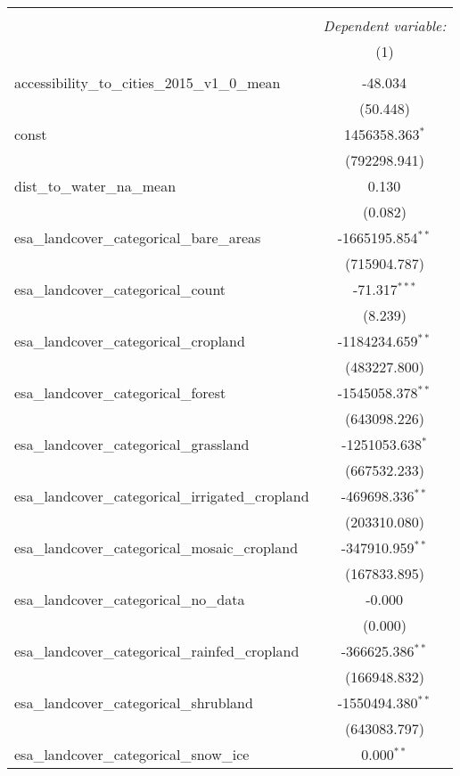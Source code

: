 \begin{table}[!htbp] \centering
\begin{tabular}{@{\extracolsep{5pt}}lc}
\\[-1.8ex]\hline
\hline \\[-1.8ex]
& \multicolumn{1}{c}{\textit{Dependent variable:}} \
\cr \cline{1-2}
\\[-1.8ex] & (1) \\
\hline \\[-1.8ex]
 accessibility_to_cities_2015_v1_0_mean & -48.034$^{}$ \\
  & (50.448) \\
 const & 1456358.363$^{*}$ \\
  & (792298.941) \\
 dist_to_water_na_mean & 0.130$^{}$ \\
  & (0.082) \\
 esa_landcover_categorical_bare_areas & -1665195.854$^{**}$ \\
  & (715904.787) \\
 esa_landcover_categorical_count & -71.317$^{***}$ \\
  & (8.239) \\
 esa_landcover_categorical_cropland & -1184234.659$^{**}$ \\
  & (483227.800) \\
 esa_landcover_categorical_forest & -1545058.378$^{**}$ \\
  & (643098.226) \\
 esa_landcover_categorical_grassland & -1251053.638$^{*}$ \\
  & (667532.233) \\
 esa_landcover_categorical_irrigated_cropland & -469698.336$^{**}$ \\
  & (203310.080) \\
 esa_landcover_categorical_mosaic_cropland & -347910.959$^{**}$ \\
  & (167833.895) \\
 esa_landcover_categorical_no_data & -0.000$^{}$ \\
  & (0.000) \\
 esa_landcover_categorical_rainfed_cropland & -366625.386$^{**}$ \\
  & (166948.832) \\
 esa_landcover_categorical_shrubland & -1550494.380$^{**}$ \\
  & (643083.797) \\
 esa_landcover_categorical_snow_ice & 0.000$^{**}$ \\

\end{tabular}
\end{table}
